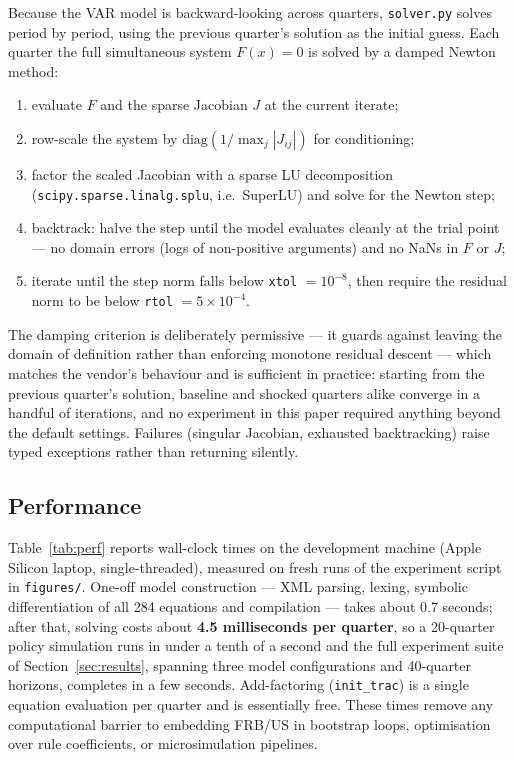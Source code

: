 Because the VAR model is backward-looking across quarters, \texttt{solver.py} solves period by period, using the previous quarter's solution as the initial guess. Each quarter the full simultaneous system $F(x)=0$ is solved by a damped Newton method:
\begin{enumerate}
  \item evaluate $F$ and the sparse Jacobian $J$ at the current iterate;
  \item row-scale the system by $\mathrm{diag}(1/\max_j |J_{ij}|)$ for conditioning;
  \item factor the scaled Jacobian with a sparse LU decomposition (\texttt{scipy.sparse.linalg.splu}, i.e.\ SuperLU) and solve for the Newton step;
  \item backtrack: halve the step until the model evaluates cleanly at the trial point --- no domain errors (logs of non-positive arguments) and no NaNs in $F$ or $J$;
  \item iterate until the step norm falls below \texttt{xtol} $=10^{-8}$, then require the residual norm to be below \texttt{rtol} $=5\times10^{-4}$.
\end{enumerate}
The damping criterion is deliberately permissive --- it guards against leaving the domain of definition rather than enforcing monotone residual descent --- which matches the vendor's behaviour and is sufficient in practice: starting from the previous quarter's solution, baseline and shocked quarters alike converge in a handful of iterations, and no experiment in this paper required anything beyond the default settings. Failures (singular Jacobian, exhausted backtracking) raise typed exceptions rather than returning silently.

\subsection{Performance}
\label{sec:performance}

Table~\ref{tab:perf} reports wall-clock times on the development machine (Apple Silicon laptop, single-threaded), measured on fresh runs of the experiment script in \texttt{figures/}. One-off model construction --- XML parsing, lexing, symbolic differentiation of all 284 equations and compilation --- takes about 0.7 seconds; after that, solving costs about \textbf{4.5 milliseconds per quarter}, so a 20-quarter policy simulation runs in under a tenth of a second and the full experiment suite of Section~\ref{sec:results}, spanning three model configurations and 40-quarter horizons, completes in a few seconds. Add-factoring (\texttt{init\_trac}) is a single equation evaluation per quarter and is essentially free. These times remove any computational barrier to embedding FRB/US in bootstrap loops, optimisation over rule coefficients, or microsimulation pipelines.


